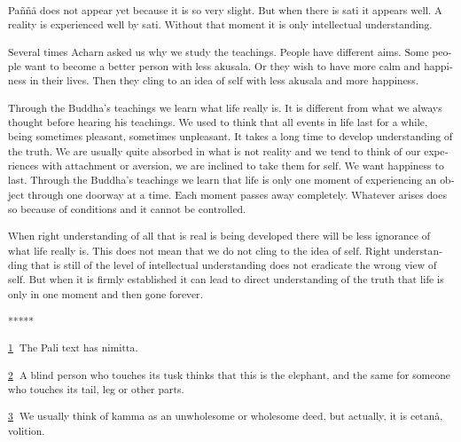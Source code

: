 \textsuperscript{\textdutch{Paññå does not appear yet because it is so
very slight. But when there is sati it appears well. A reality is
experienced well by sati. Without that moment it is only intellectual
understanding. }}

\textsuperscript{\textdutch{Several times Acharn asked us why we study
the teachings. People have different aims. Some people want to become a
better person with less akusala. Or they wish to have more calm and
happiness in their lives. Then they cling to an idea of self with less
akusala and more happiness. }}

\textsuperscript{\textdutch{Through the Buddha's teachings we learn what
life really is. It is different from what we always thought before
hearing his teachings. We used to think that all events in life last for
a while, being sometimes pleasant, sometimes unpleasant. It takes a long
time to develop understanding of the truth. We are usually quite
absorbed in what is not reality and we tend to think of our experiences
with attachment or aversion, we are inclined to take them for self. We
want happiness to last. Through the Buddha's teachings we learn that
life is only one moment of experiencing an object through one doorway at
a time. Each moment passes away completely. Whatever arises does so
because of conditions and it cannot be controlled. }}

\textsuperscript{\textdutch{When right understanding of all that is real
is being developed there will be less ignorance of what life really is.
This does not mean that we do not cling to the idea of self. Right
understanding that is still of the level of intellectual understanding
does not eradicate the wrong view of self. But when it is firmly
established it can lead to direct understanding of the truth that life
is only in one moment and then gone forever. }}

\textsuperscript{\textdutch{*****}}

\hypertarget{sdfootnote1}{}
\textsuperscript{\protect\hyperlink{sdfootnote1anc}{1} \textdutch{The
Pali text has nimitta.}}

\hypertarget{sdfootnote2}{}
\textsuperscript{\protect\hyperlink{sdfootnote2anc}{2} \textdutch{A
blind person who touches its tusk thinks that this is the elephant, and
the same for someone who touches its tail, leg or other parts. }}

\hypertarget{sdfootnote3}{}
\textsuperscript{\protect\hyperlink{sdfootnote3anc}{3} \textdutch{We
usually think of kamma as an unwholesome or wholesome deed, but
actually, it is cetanå, volition. }}

